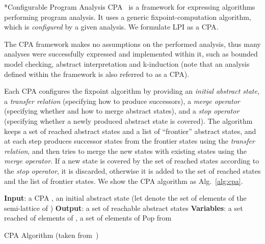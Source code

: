 \documentclass{llncs}
\makeatletter
\renewcommand{\paragraph}{\@startsection{paragraph}{4}{\z@}{0.8ex \@plus 0ex \@minus 1ex}{-1em}{\normalfont\normalsize\bfseries}}
\makeatother
\begin{document}
\paragraph*{Configurable Program Analysis}
\textsc{CPA}~\cite{cpa} is a framework for expressing algorithms performing
program analysis.
It uses a generic fixpoint-computation algorithm,
which is \emph{configured} by a given analysis.
We formulate LPI as a \textsc{CPA}.

The \textsc{CPA} framework makes no assumptions on the performed analysis,
thus many analyses were successfully expressed and implemented
within it, such as bounded model checking, abstract
interpretation and k-induction (note that an analysis defined within the framework is
also referred to as a \textsc{CPA}).

Each \textsc{CPA} configures the fixpoint algorithm by providing
an \emph{initial abstract state}, a \emph{transfer relation}
(specifying how to produce successors),
a \emph{merge operator} (specifying whether and how to merge abstract states),
and a \emph{stop operator} (specifying whether a newly produced abstract state is
covered).
The algorithm keeps a set of reached abstract states and a list of ``frontier''
abstract states,
and at each step produces successor states from the frontier states using the \emph{transfer relation},
and then tries to merge the new states with existing states using the
\emph{merge operator}.
If a new state is covered by the set of reached states
according to the \emph{stop operator},
it is discarded, otherwise it is added to the set of reached states
and the list of frontier states.
We show the CPA algorithm as Alg.~\ref{alg:cpa}.

\begin{algorithm}[t]
    \centering
    \begin{algorithmic}[1]
        \State \textbf{Input}: a CPA , an initial abstract state 
            (let  denote the set of elements of the semi-lattice of )
        \State \textbf{Output}: a set of reachable abstract states
        \State \textbf{Variables}: a set reached of elements of , a set
         of elements of 
        \State 
        \State 
        \While{}
            \State Pop  from 
            \ForAll{}
                \ForAll{}
                    \State 
                    \If{}
                        \State 
                        \State 
                    \EndIf
                \EndFor
                \If{}
                    \State 
                    \State 
                \EndIf
            \EndFor
        \EndWhile
        \Return 
    \end{algorithmic}
    \caption{CPA Algorithm (taken from~\cite{cpa})}
    \label{alg:cpa}
\end{algorithm}
\end{document}
